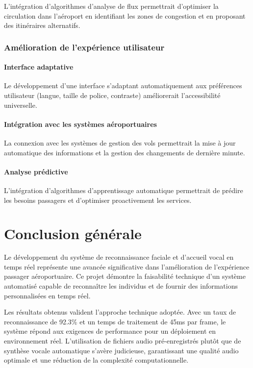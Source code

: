 \documentclass[12pt,a4paper]{article}
\begin{document}
L'intégration d'algorithmes d'analyse de flux permettrait d'optimiser la circulation dans l'aéroport en identifiant les zones de congestion et en proposant des itinéraires alternatifs.

\subsubsection{Amélioration de l'expérience utilisateur}

\paragraph{Interface adaptative}

Le développement d'une interface s'adaptant automatiquement aux préférences utilisateur (langue, taille de police, contraste) améliorerait l'accessibilité universelle.

\paragraph{Intégration avec les systèmes aéroportuaires}

La connexion avec les systèmes de gestion des vols permettrait la mise à jour automatique des informations et la gestion des changements de dernière minute.

\paragraph{Analyse prédictive}

L'intégration d'algorithmes d'apprentissage automatique permettrait de prédire les besoins passagers et d'optimiser proactivement les services.

\newpage

\section{Conclusion générale}

Le développement du système de reconnaissance faciale et d'accueil vocal en temps réel représente une avancée significative dans l'amélioration de l'expérience passager aéroportuaire. Ce projet démontre la faisabilité technique d'un système automatisé capable de reconnaître les individus et de fournir des informations personnalisées en temps réel.

Les résultats obtenus valident l'approche technique adoptée. Avec un taux de reconnaissance de 92.3\% et un temps de traitement de 45ms par frame, le système répond aux exigences de performance pour un déploiement en environnement réel. L'utilisation de fichiers audio pré-enregistrés plutôt que de synthèse vocale automatique s'avère judicieuse, garantissant une qualité audio optimale et une réduction de la complexité computationnelle.
\end{document}
